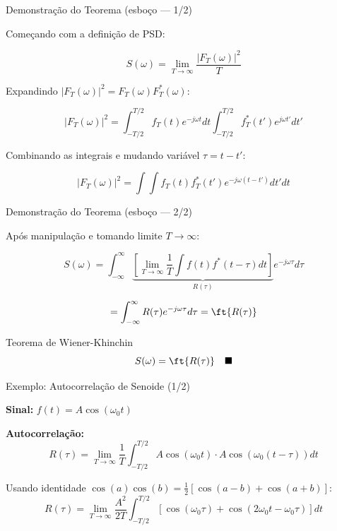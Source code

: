 
\begin{frame}{Demonstração do Teorema (esboço --- 1/2)}

Começando com a definição de PSD:

\[
S(\omega) = \lim_{T \to \infty} \frac{|F_T(\omega)|^2}{T}
\]

Expandindo $|F_T(\omega)|^2 = F_T(\omega) F_T^*(\omega)$:

\[
|F_T(\omega)|^2 = \int_{-T/2}^{T/2} f_T(t) e^{-j\omega t} dt \int_{-T/2}^{T/2} f_T^*(t') e^{j\omega t'} dt'
\]

Combinando as integrais e mudando variável $\tau = t - t'$:

\[
|F_T(\omega)|^2 = \int \int f_T(t) f_T^*(t') e^{-j\omega(t-t')} dt' dt
\]

\end{frame}


\begin{frame}{Demonstração do Teorema (esboço --- 2/2)}

Após manipulação e tomando limite $T \to \infty$:

\[
S(\omega) = \int_{-\infty}^{\infty} \underbrace{\left[\lim_{T \to \infty} \frac{1}{T} \int f(t) f^*(t-\tau) dt\right]}_{R(\tau)} e^{-j\omega\tau} d\tau
\]

\[
= \int_{-\infty}^{\infty} R(\tau) e^{-j\omega\tau} d\tau = \ft\{R(\tau)\}
\]

\begin{block}{Teorema de Wiener-Khinchin}
\[
S(\omega) = \ft\{R(\tau)\} \quad \blacksquare
\]
\end{block}

\end{frame}


\begin{frame}{Exemplo: Autocorrelação de Senoide (1/2)}

\textbf{Sinal:} $f(t) = A\cos(\omega_0 t)$

\textbf{Autocorrelação:}
\[
R(\tau) = \lim_{T \to \infty} \frac{1}{T} \int_{-T/2}^{T/2} A\cos(\omega_0 t) \cdot A\cos(\omega_0(t-\tau)) dt
\]

Usando identidade $\cos(a)\cos(b) = \frac{1}{2}[\cos(a-b) + \cos(a+b)]$:
\[
R(\tau) = \lim_{T \to \infty} \frac{A^2}{2T} \int_{-T/2}^{T/2} [\cos(\omega_0 \tau) + \cos(2\omega_0 t - \omega_0\tau)] dt
\]

\end{frame}

